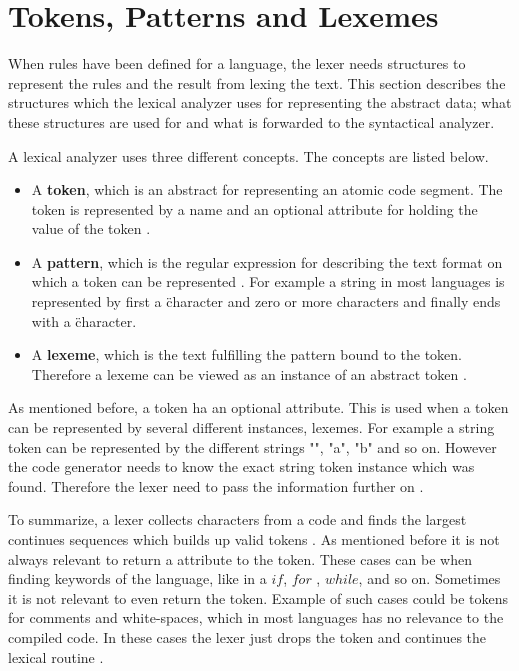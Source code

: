 \section{Tokens, Patterns and Lexemes}
When rules have been defined for a language, the lexer needs structures to
represent the rules and the result from lexing the text.
This section describes the structures which the lexical analyzer uses
for representing the abstract data; what these structures are used for and what is
forwarded to the syntactical analyzer.

A lexical analyzer uses three different concepts. The concepts are listed
below.
\begin{itemize}
  \item A \textbf{token}, which is an abstract for representing an atomic code
  segment. The token is represented by a name and an optional attribute for
  holding the value of the token \cite{Aho2006}.
  \item A \textbf{pattern}, which is the regular expression for describing the
  text format on which a token can be represented \cite{Aho2006}. For example a
  string in most languages is represented by first a \" character and zero or 
  more characters and finally ends with a \" character.
  \item A \textbf{lexeme}, which is the text fulfilling the pattern bound to 
  the token. Therefore a lexeme can be viewed as an instance of an abstract 
  token \cite{Aho2006}.
\end{itemize}
As mentioned before, a token ha an optional attribute. This is used when a 
token can be represented by several different instances, lexemes. For example a 
string token can be represented by the different strings "", "a", "b" and so 
on. However the code generator needs to know the exact string token instance 
which was found. Therefore the lexer need to pass the information further on \cite{Aho2006}.

To summarize, a lexer collects characters from a code and finds the largest 
continues sequences which builds up valid tokens \cite{sebesta2012}. As 
mentioned before it is not always relevant to return a attribute to the token. 
These cases can be when finding keywords of the language, like in a $if$, $for$
, $while$, and so on. Sometimes it is not relevant to even return the token. 
Example of such cases could be tokens for comments and white-spaces, which in 
most languages has no relevance to the compiled code. In these cases the lexer 
just drops the token and continues the lexical routine \cite{Aho2006}.

